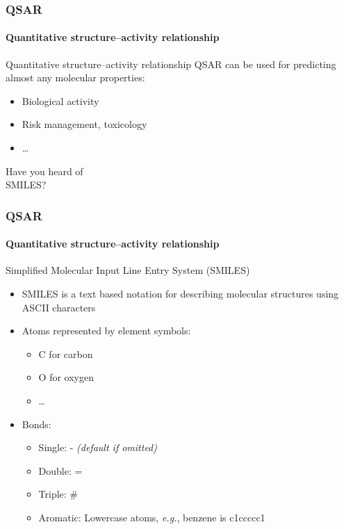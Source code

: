 \documentclass[aspectratio=169,dvipsnames]{beamer}
\begin{document}
    \begin{frame}
        \frametitle{QSAR}
        \framesubtitle{Quantitative structure–activity relationship}

        \begin{block}{Quantitative structure–activity relationship}
            QSAR can be used for predicting almost any molecular properties:
            \begin{itemize}
                \item Biological activity
                \item Risk management, toxicology
                \item \ldots
            \end{itemize}
        \end{block}

    \end{frame}
{

    \begin{frame}[plain]
        \begin{center}
        Have you heard of \\
        \Huge SMILES?
        \end{center}
    \end{frame}
}
    \begin{frame}
        \frametitle{QSAR}
        \framesubtitle{Quantitative structure–activity relationship}
        \vspace{-30pt}
        \begin{block}{Simplified Molecular Input Line Entry System (SMILES)}
        \begin{itemize}
            \item SMILES is a text based notation for describing molecular structures using ASCII characters
            \item Atoms represented by element symbols:
            {\small
            \begin{itemize}
                \item C for carbon
                \item O for oxygen
                \item \ldots
            \end{itemize}
            }
            \item Bonds:
            {\small
            \begin{itemize}
                \item Single: - \textit{(default if omitted)}
                \item Double: =
                \item Triple: \#
                \item Aromatic: Lowercase atoms, \textit{e.g.}, benzene is c1ccccc1
            \end{itemize}
            }
        \end{itemize}
        \end{block}
    \end{frame}
\end{document}
